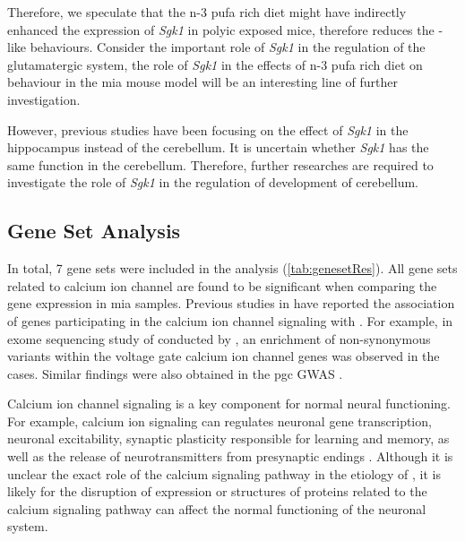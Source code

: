 Therefore, we speculate that the n-3 \gls{pufa} rich diet might have indirectly enhanced the expression of \textit{Sgk1} in \gls{polyic} exposed mice, therefore reduces the -like behaviours.
Consider the important role of \textit{Sgk1} in the regulation of the glutamatergic system, the role of \textit{Sgk1} in the effects of n-3 \gls{pufa} rich diet on behaviour in the \gls{mia} mouse model will be an interesting line of further investigation.

However, previous studies have been focusing on the effect of \textit{Sgk1} in the hippocampus instead of the cerebellum. 
It is uncertain whether \textit{Sgk1} has the same function in the cerebellum.
Therefore, further researches are required to investigate the role of \textit{Sgk1} in the regulation of development of cerebellum.

\subsection{Gene Set Analysis}
In total, 7 gene sets were included in the analysis (\cref{tab:genesetRes}). 
All gene sets related to calcium ion channel are found to be significant when comparing the gene expression in \gls{mia} samples. 
Previous studies in  have reported the association of genes participating in the calcium ion channel signaling with  \citep{Lidow2003,Purcell2014,Ripke2014}.
For example, in exome sequencing study of  conducted by \citet{Purcell2014}, an enrichment of non-synonymous variants within the voltage gate calcium ion channel genes was observed in the  cases.
Similar findings were also obtained in the \gls{pgc}  \gls{GWAS} \citep{Ripke2014}.

Calcium ion channel signaling is a key component for normal neural functioning.
For example, calcium ion signaling can regulates neuronal gene transcription, neuronal excitability, synaptic plasticity responsible for learning and memory, as well as the release of neurotransmitters from presynaptic endings \citep{Berridge2014}.
Although it is unclear the exact role of the calcium signaling pathway in the etiology of , it is likely for the disruption of expression or structures of proteins related to the calcium signaling pathway can affect the normal functioning of the neuronal system.

